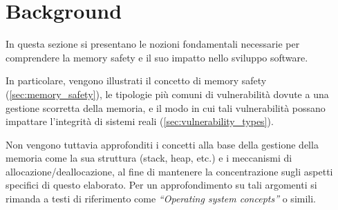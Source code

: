 \chapter{Background}
\label{cha:background}

In questa sezione si presentano le nozioni fondamentali necessarie per
comprendere la memory safety e il suo impatto nello sviluppo software.

In particolare, vengono illustrati il concetto di memory safety (\autoref{sec:memory_safety}),
le tipologie più comuni di vulnerabilità dovute a una gestione scorretta della
memoria, e il modo in cui tali vulnerabilità possano impattare l'integrità di sistemi
reali (\autoref{sec:vulnerability_types}).

Non vengono tuttavia approfonditi i concetti alla base della gestione della memoria
come la sua struttura (stack, heap, etc.) e i meccanismi di allocazione/deallocazione,
al fine di mantenere la concentrazione sugli aspetti specifici di questo elaborato.
Per un approfondimento su tali argomenti si rimanda a testi di riferimento come
\textit{``Operating system concepts''}\cite{os_concepts} o simili.



